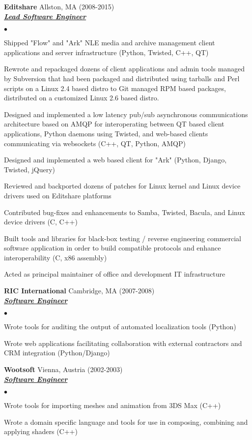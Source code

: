 \documentclass{article}
\newcommand{\employer}[4]{{ \textbf{#1} #2 (#3)\\ \underline{\textbf{\emph{#4}}}\\  }}
\newenvironment{achievements}{\begin{list}{$\bullet$}{\topsep 0pt \itemsep -2pt}}{\vspace*{4pt}\end{list}}
\begin{document}
	\employer{Editshare} {Allston, MA} {2008-2015} {Lead Software Engineer}
	\begin{achievements}
	\item Shipped "Flow" and "Ark" NLE media and archive management client applications and server infrastructure (Python, Twisted, C++, QT)
	\item Rewrote and repackaged dozens of client applications and admin tools managed by Subversion that had been packaged and distributed using tarballs and Perl scripts on a Linux 2.4 based distro to Git managed RPM based packages, distributed on a customized Linux 2.6 based distro.
	\item Designed and implemented a low latency pub/sub asynchronous communications architecture based on AMQP for interoperating between QT based client applications, Python daemons using Twisted, and web-based clients communicating via websockets (C++, QT, Python, AMQP)
	\item Designed and implemented a web based client for "Ark" (Python, Django, Twisted, jQuery)
	\item Reviewed and backported dozens of patches for Linux kernel and Linux device drivers used on Editshare platforms
	\item Contributed bug-fixes and enhancements to Samba, Twisted, Bacula, and Linux device drivers (C, C++)
	\item Built tools and libraries for black-box testing / reverse engineering commercial software application in order to build compatible protocols and enhance interoperability (C, x86 assembly)
	\item Acted as principal maintainer of office and development IT infrastructure
	\end{achievements}

	\employer{RIC International} {Cambridge, MA} {2007-2008} {Software Engineer}
	\begin{achievements}
	\item Wrote tools for auditing the output of automated localization tools (Python)
	\item Wrote web applications facilitating collaboration with external contractors and CRM integration (Python/Django)
	\end{achievements}

	\employer{Wootsoft} {Vienna, Austria} {2002-2003} {Software Engineer}
	\begin{achievements}
	\item Wrote tools for importing meshes and animation from 3DS Max (C++)
	\item Wrote a domain specific language and tools for use in composing, combining and applying shaders (C++)
	\end{achievements}
\end{document}
